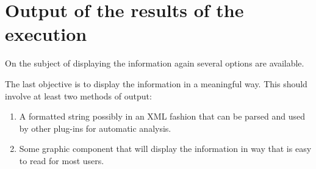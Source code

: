\section{Output of the results of the execution}
\label{section:AutoConceptsOutput}
On the subject of displaying the information again several options
are available.


The last objective is to display the information in a meaningful way.
This should involve at least two methods of output:
\begin{enumerate}
  \item A formatted string possibly in an XML fashion that can be parsed and
  used by other plug-ins for automatic analysis.
  \item Some graphic component that will display the information in way that is
  easy to read for most users.
\end{enumerate}